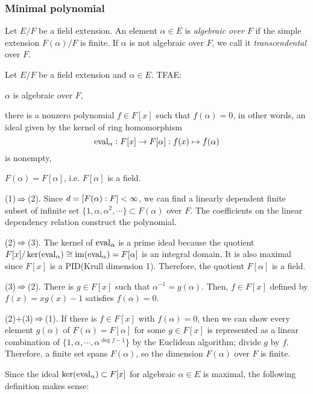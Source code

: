 \documentclass{../exp}
\begin{document}
\subsubsection{Minimal polynomial}

\begin{defn}
Let $E/F$ be a field extension.
An element $\alpha\in E$ is \emph{algebraic over $F$} if the simple extension $F(\alpha)/F$ is finite.
If $\alpha$ is not algebraic over $F$, we call it \emph{transcendental} over $F$.
\end{defn}
\begin{prop}
Let $E/F$ be a field extension and $\alpha\in E$.
TFAE:
\begin{cond}
\item $\alpha$ is algebraic over $F$,
\item there is a nonzero polynomial $f\in F[x]$ such that $f(\alpha)=0$, in other words, an ideal given by the kernel of ring homomorphism
\[\eval_\alpha:F[x]\to F[\alpha]:f(x)\mapsto f(\alpha)\]
is nonempty,
\item $F(\alpha)=F[\alpha]$, i.e. $F[\alpha]$ is a field.
\end{cond}
\end{prop}
\begin{pf}
(1)$\impl$(2).
Since $d=[F(\alpha):F]<\infty$, we can find a linearly dependent finite subset of infinite set $\{1,\alpha,\alpha^2,\cdots\}\subset F(\alpha)$ over $F$.
The coefficients on the linear dependency relation construct the polynomial.

(2)$\impl$(3).
The kernel of $\operatorname{eval}_\alpha$ is a prime ideal because the quotient $F[x]/\ker(\operatorname{eval}_\alpha)\cong\operatorname{im}(\operatorname{eval}_\alpha)=F[\alpha]$ is an integral domain.
It is also maximal since $F[x]$ is a PID(Krull dimension 1).
Therefore, the quotient $F[\alpha]$ is a field.

(3)$\impl$(2).
There is $g\in F[x]$ such that $\alpha^{-1}=g(\alpha)$.
Then, $f\in F[x]$ defined by $f(x)=xg(x)-1$ satisfies $f(\alpha)=0$.

(2)$+$(3)$\impl$(1).
If there is $f\in F[x]$ with $f(\alpha)=0$, then we can show every element $g(\alpha)$ of $F(\alpha)=F[\alpha]$ for some $g\in F[x]$ is represented as a linear combination of $\{1,\alpha,\cdots,\alpha^{\deg f-1}\}$ by the Euclidean algorithm; divide $g$ by $f$.
Therefore, a finite set spans $F(\alpha)$, so the dimension $F(\alpha)$ over $F$ is finite.
\end{pf}

Since the ideal $\ker(\operatorname{eval}_\alpha)\subset F[x]$ for algebraic $\alpha\in E$ is maximal, the following definition makes sense:
\end{document}

